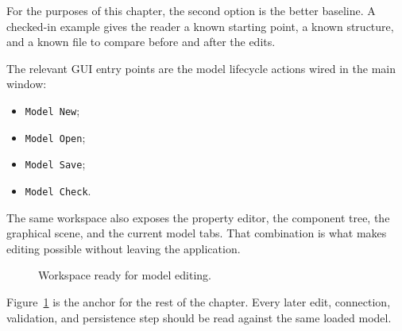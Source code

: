 For the purposes of this chapter, the second option is the better baseline. A checked-in example gives
the reader a known starting point, a known structure, and a known file to compare before and after the
edits.

The relevant GUI entry points are the model lifecycle actions wired in the main window:
\begin{itemize}
\item \texttt{Model New};
\item \texttt{Model Open};
\item \texttt{Model Save};
\item \texttt{Model Check}.
\end{itemize}

The same workspace also exposes the property editor, the component tree, the graphical scene, and the
current model tabs. That combination is what makes editing possible without leaving the application.

\begin{figure}[htbp]
\centering
\caption{Workspace ready for model editing.}
\label{fig:model-editing-workflow}
\end{figure}

Figure~\ref{fig:model-editing-workflow} is the anchor for the rest of the chapter. Every later edit,
connection, validation, and persistence step should be read against the same loaded model.

